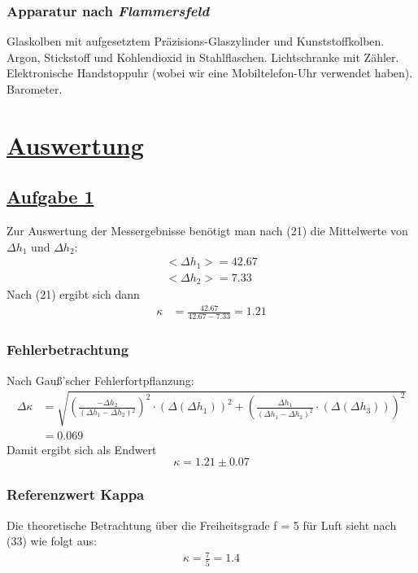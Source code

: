 \documentclass[11pt,a4paper]{article}
\begin{document}
  \subsubsection{Apparatur nach \itshape{Flammersfeld}\/}
  Glaskolben mit aufgesetztem Pr\"azisions-Glaszylinder und Kunststoffkolben. Argon, 
  Stickstoff und Kohlendioxid in Stahlflaschen. Lichtschranke mit Z\"ahler. Elektronische
  Handstoppuhr (wobei wir eine Mobiltelefon-Uhr verwendet haben). Barometer.
  \newpage
  \section{\underline{Auswertung}}
\subsection{\underline{Aufgabe 1}}
Zur Auswertung der Messergebnisse benötigt man nach (21) die Mittelwerte von $\Delta h_{1} $ und $\Delta h_{2}$:
\begin{align*}
  <\Delta h_{1}> = 42.67 \\
  <\Delta h_{2}> = 7.33
\end{align*}
Nach (21) ergibt sich dann
\begin{align*}
  \kappa &= \frac{42.67}{42.67-7.33} = 1.21
\end{align*}
\subsubsection{Fehlerbetrachtung}
Nach Gauß'scher Fehlerfortpflanzung:
\begin{align*}
    \Delta \kappa &= \sqrt{{\left(\frac{- \Delta h_{2}}{{(\Delta h_{1}-\Delta
    h_{2})}{^2}}\right)}^{2} \cdot {(\Delta(\Delta h_{1}))}^{2}+{\left(\frac{\Delta
    h_{1}}{{(\Delta h_{1} - \Delta h_{2})}^{2}}\cdot (\Delta(\Delta h_{3}))\right)}^{2}}\\
&= 0.069
\end{align*}
Damit ergibt sich als Endwert
\begin{equation*}
  \kappa = 1.21 \pm 0.07
\end{equation*}

\subsubsection{Referenzwert Kappa}
Die theoretische Betrachtung über die Freiheitsgrade f = 5 für Luft sieht nach
(33) wie folgt aus:
\begin{align*}
    \kappa = \frac{7}{5} = 1.4
\end{align*}
\end{document}
